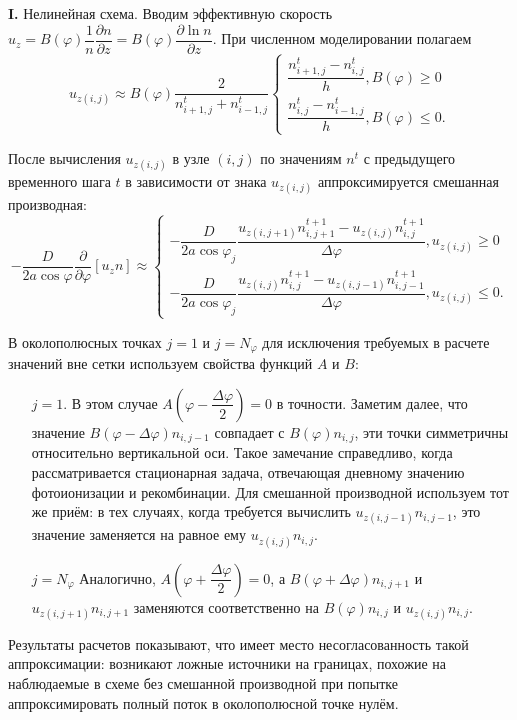 \documentclass[2pt, a4paper, fleqn]{extarticle}
\let\leq\leqslant
\let\geq\geqslant
\begin{document}
\bigskip

{\bf I.} Нелинейная схема. Вводим эффективную скорость $u_z = B(\varphi)\dfrac{1}{n}\dfrac{\partial n}{\partial z} = B(\varphi)\dfrac{\partial \ln n}{\partial z}$. При численном моделировании полагаем $$u_{z(i, j)} \approx B(\varphi)\dfrac{2}{n_{i+1, j}^t+n_{i-1, j}^t}\begin{cases}\dfrac{n_{i+1, j}^t-n_{i, j}^t}{h}, B(\varphi) \geq 0\\\dfrac{n_{i, j}^t-n_{i-1, j}^t}{h}, B(\varphi) \leq 0 .\end{cases}$$ 

После вычисления $u_{z(i, j)}$ в узле $(i, j)$ по значениям $n^t$ с предыдущего временного шага $t$ в зависимости от знака $u_{z(i, j)}$ аппроксимируется смешанная производная: $$-\dfrac{D}{2a\cos\varphi}\dfrac{\partial}{\partial\varphi}\left[u_z n\right] \approx \begin{cases}-\dfrac{D}{2a\cos\varphi_j}\dfrac{u_{z(i, j+1)}n_{i, j+1}^{t+1} - u_{z(i, j)}n_{i, j}^{t+1}}{\Delta\varphi}, u_{z(i, j)} \geq 0\\-\dfrac{D}{2a\cos\varphi_j}\dfrac{u_{z(i, j)}n_{i, j}^{t+1} - u_{z(i, j-1)}n_{i, j-1}^{t+1}}{\Delta\varphi}, u_{z(i, j)} \leq 0.\end{cases}$$

В околополюсных точках $j = 1$ и $j = N_\varphi$ для исключения требуемых в расчете значений вне сетки используем свойства функций $A$ и $B$:

\begin{itemize}
\item[$j = 1$.] В этом случае $A\left(\varphi - \dfrac{\Delta\varphi}{2}\right) = 0$ в точности. Заметим далее, что значение $B(\varphi - \Delta\varphi) n_{i, j-1}$ совпадает с $B(\varphi) n_{i, j}$, эти точки симметричны относительно вертикальной оси. Такое замечание справедливо, когда рассматривается стационарная задача, отвечающая дневному значению фотоионизации и рекомбинации. Для смешанной производной используем тот же приём: в тех случаях, когда требуется вычислить $u_{z(i, j-1)}n_{i, j-1}$, это значение заменяется на равное ему $u_{z(i, j)}n_{i, j}$.

\item[$j = N_\varphi$] Аналогично, $A\left(\varphi + \dfrac{\Delta\varphi}{2}\right) = 0$, а $B(\varphi + \Delta\varphi)n_{i, j+1}$ и $u_{z(i, j+1)}n_{i, j+1}$ заменяются соответственно на $B(\varphi)n_{i, j}$ и $u_{z(i, j)}n_{i, j}$.
\end{itemize}

Результаты расчетов показывают, что имеет место несогласованность такой аппроксимации: возникают ложные источники на границах, похожие на наблюдаемые в схеме без смешанной производной при попытке аппроксимировать полный поток в околополюсной точке нулём.
\end{document}
